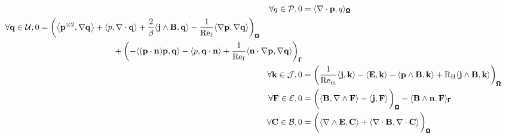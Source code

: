     \begin{align}
        \forall q \in \calP,  0  &=  \langle\nabla\cdot\bfp, q\rangle_{\bfOmega}  \\
        \begin{split}
            \forall \bfq \in \calU,  0  &=  \left(\left\langle\bfp^{\otimes 2}, \nabla\bfq\right\rangle + \langle p, \nabla\cdot\bfq\rangle + \frac{2}{\beta}\langle\bfj\wedge\bfB, \bfq\rangle - \frac{1}{\rmRef}\langle\nabla\bfp, \nabla\bfq\rangle\right)_{\bfOmega}  \\
            &\;\;\;\;\;\;\;\;\;\;\;\;\;\;\;\;\;\;\;\;\;\;\;\;\;\;\;\;\;\;\;\;  + \left(- \langle(\bfp\cdot\bfn)\bfp, \bfq\rangle - \langle p, \bfq\cdot\bfn\rangle + \frac{1}{\rmRef}\langle\bfn\cdot\nabla\bfp, \nabla\bfq\rangle\right)_{\bfGamma}
        \end{split}  \\
        \forall \bfk \in \calJ,  0  &=  \left(\frac{1}{\rmRem}\langle\bfj, \bfk\rangle - \langle\bfE, \bfk\rangle - \langle\bfp\wedge\bfB, \bfk\rangle + \rmRH\langle\bfj\wedge\bfB, \bfk\rangle\right)_{\bfOmega}  \\
        \forall \bfF \in \calE,  0  &=  \left(\langle\bfB, \nabla\wedge\bfF\rangle - \langle\bfj, \bfF\rangle\tall\right)_{\bfOmega} - \langle\bfB\wedge\bfn, \bfF\rangle_{\bfGamma}  \\
        \forall \bfC \in \calB,  0  &=  \left(\langle\nabla\wedge\bfE, \bfC\rangle + \langle\nabla\cdot\bfB, \nabla\cdot\bfC\rangle\tall\right)_{\bfOmega}
    \end{align}

